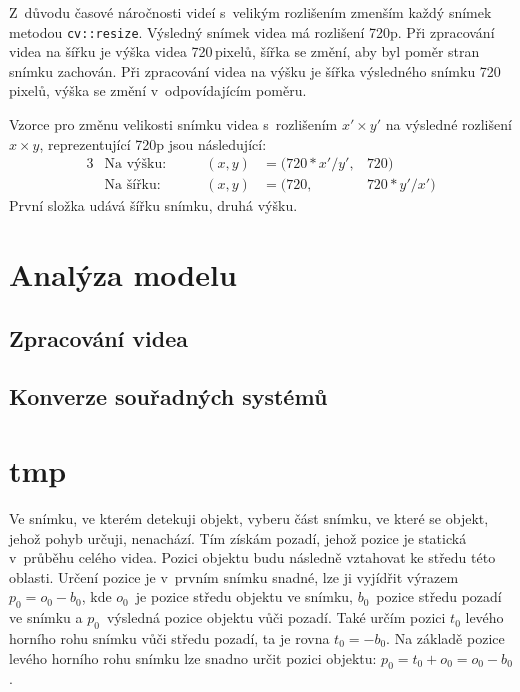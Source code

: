 Z~důvodu časové náročnosti videí s~velikým rozlišením zmenším každý snímek metodou \texttt{cv::resize}. Výsledný snímek videa má rozlišení 720p. Při zpracování videa na šířku je výška videa 720\,\rm pixelů, šířka se změní, aby byl poměr stran snímku zachován. Při zpracování videa na výšku je šířka výsledného snímku 720\,\rm pixelů, výška se změní v~odpovídajícím poměru.

Vzorce pro změnu velikosti snímku videa s~rozlišením $x'\times y'$ na výsledné rozlišení $x\times y$, reprezentující 720p jsou následující:
\begin{alignat*}{3}
&\text{Na výšku:}   &\qquad (x, y) &= (720 * x' / y',  &720) \\
&\text{Na šířku:}   &\qquad (x, y) &= (720,            &720 * y' / x')
\end{alignat*}
První složka udává šířku snímku, druhá výšku.









\section{Analýza modelu}

\subsection{}



\subsection{Zpracování videa}




\subsection{Konverze souřadných systémů}
\label{ssec:konverze}



\section{tmp}

Ve snímku, ve kterém detekuji objekt, vyberu část snímku, ve které se objekt, jehož pohyb určuji, nenachází. Tím získám pozadí, jehož pozice je statická v~průběhu celého videa. Pozici objektu budu následně vztahovat ke středu této oblasti. Určení pozice je v~prvním snímku snadné, lze ji vyjídřit výrazem $p_0=o_0-b_0$, kde $o_0$~je pozice středu objektu ve snímku, $b_0$~pozice středu pozadí ve snímku a $p_0$~výsledná pozice objektu vůči pozadí. Také určím pozici $t_0$ levého horního rohu snímku vůči středu pozadí, ta je rovna $t_0=-b_0$. Na základě pozice levého horního rohu snímku lze snadno určit pozici objektu: $p_0=t_0+o_0=o_0-b_0$.

